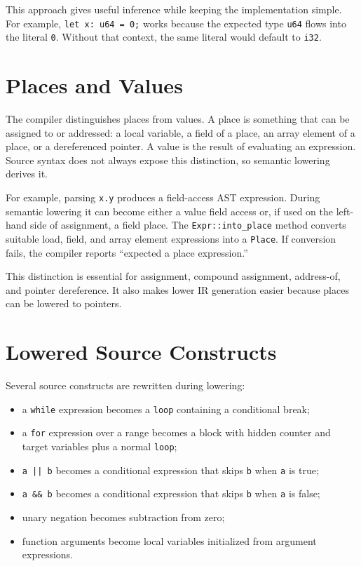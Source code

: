 This approach gives useful inference while keeping the implementation simple.
For example, \texttt{let x: u64 = 0;} works because the expected type
\texttt{u64} flows into the literal \texttt{0}. Without that context, the same
literal would default to \texttt{i32}.

\section{Places and Values}

The compiler distinguishes places from values. A place is something that can be
assigned to or addressed: a local variable, a field of a place, an array element
of a place, or a dereferenced pointer. A value is the result of evaluating an
expression. Source syntax does not always expose this distinction, so semantic
lowering derives it.

For example, parsing \texttt{x.y} produces a field-access AST expression. During
semantic lowering it can become either a value field access or, if used on the
left-hand side of assignment, a field place. The \texttt{Expr::into\_place}
method converts suitable load, field, and array element expressions into a
\texttt{Place}. If conversion fails, the compiler reports ``expected a place
expression.''

This distinction is essential for assignment, compound assignment, address-of,
and pointer dereference. It also makes lower IR generation easier because places
can be lowered to pointers.

\section{Lowered Source Constructs}

Several source constructs are rewritten during \irtree{} lowering:

\begin{itemize}
  \item a \texttt{while} expression becomes a \texttt{loop} containing a
        conditional break;
  \item a \texttt{for} expression over a range becomes a block with hidden
        counter and target variables plus a normal \texttt{loop};
  \item \texttt{a || b} becomes a conditional expression that skips
        \texttt{b} when \texttt{a} is true;
  \item \texttt{a \&\& b} becomes a conditional expression that skips
        \texttt{b} when \texttt{a} is false;
  \item unary negation becomes subtraction from zero;
  \item function arguments become local variables initialized from argument
        expressions.
\end{itemize}

